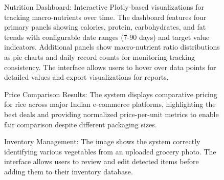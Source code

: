 \documentclass{ecai}
\begin{document}
\begin{figure}[h]
\centering
{}
\caption{Nutrition Dashboard: Interactive Plotly-based visualizations for tracking macro-nutrients over time. The dashboard features four primary panels showing calories, protein, carbohydrates, and fat trends with configurable date ranges (7-90 days) and target value indicators. Additional panels show macro-nutrient ratio distributions as pie charts and daily record counts for monitoring tracking consistency. The interface allows users to hover over data points for detailed values and export visualizations for reports.}
\end{figure}

\begin{figure}[h]
\centering
{}
\caption{Price Comparison Results: The system displays comparative pricing for rice across major Indian e-commerce platforms, highlighting the best deals and providing normalized price-per-unit metrics to enable fair comparison despite different packaging sizes.}
\end{figure}

\begin{figure}[h]
\centering
{}
\caption{Inventory Management: The image shows the system correctly identifying various vegetables from an uploaded grocery photo. The interface allows users to review and edit detected items before adding them to their inventory database.}
\end{figure}
\end{document}
